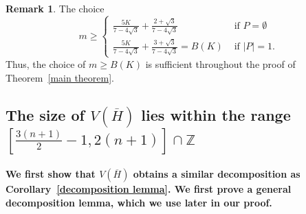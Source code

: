 \documentclass[reqno,10pt]{amsart}
\theoremstyle{definition}
\newtheorem*{remark}{Remark}
\begin{document}
\begin{remark}
The choice
\begin{equation*}
m\geq\begin{cases}
\frac{5K}{7-4\sqrt{3}}+\frac{2+\sqrt3}{7-4\sqrt{3}}&\text{ if } P=\emptyset\\
\frac{5K}{7-4\sqrt{3}}+\frac{3+\sqrt3}{7-4\sqrt{3}}=B(K)&\text{ if } |P|=1.
\end{cases}    
\end{equation*}
Thus, the choice of $m\geq B(K)$ is sufficient throughout the proof of Theorem~\ref{main theorem}.
\end{remark}


\subsection{The size of \texorpdfstring{$V(\overline{H})$}{$V(\overline{H})$} lies within the  range \texorpdfstring{$\left[\frac{3(n+1)}{2}-1, 2(n+1)\right]\cap\mathbb{Z}$}{$\left[\frac{3(n+1)}{2}-1, 2(n+1)\right]\cap\mathbb{Z}$}}

\paragraph{We first show that $V(\overline{H})$ obtains a similar decomposition as Corollary~\ref{decomposition lemma}. We first prove a general decomposition lemma, which we use later in our proof.}
\end{document}
